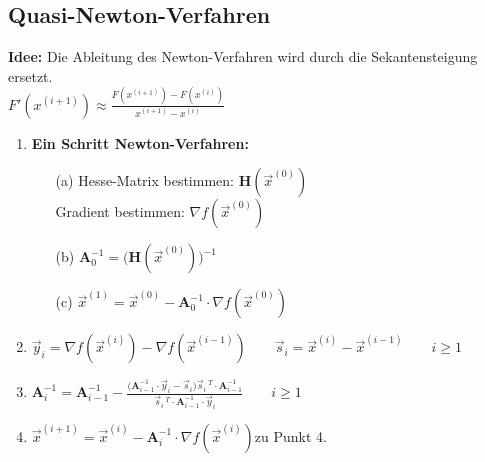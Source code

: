 \subsection{Quasi-Newton-Verfahren}
  \begin{minipage}{13cm}
  \textbf{Idee:} Die Ableitung des Newton-Verfahren wird durch die Sekantensteigung ersetzt.\\
  
  $F'(x^{(i+1)})\approx\frac{F(x^{(i+1)})-F(x^{(i)})}{x^{(i+1)}-x^{(i)}}$\\
  
 \begin{enumerate}
 \item \textbf{Ein Schritt Newton-Verfahren:}
	 \begin{enumerate}
	 \item[(a)] Hesse-Matrix bestimmen: $\mathbf{H}(\vec{x}^{(0)})$\\
	 Gradient bestimmen: $\nabla f(\vec{x}^{(0)})$
	 \item[(b)] $\mathbf{A}_{0}^{-1}=\bigl(\mathbf{H}(\vec{x}^{(0)})\bigr)^{-1}$
	 \item[(c)] $\vec{x}^{(1)}=\vec{x}^{(0)}-\mathbf{A}_{0}^{-1}\cdot\nabla f(\vec{x}^{(0)})$\\
	 \end{enumerate}
 \item $\vec{y}_i=\nabla f(\vec{x}^{(i)})-\nabla f(\vec{x}^{(i-1)})\qquad \vec{s}_i=\vec{x}^{(i)}-\vec{x}^{(i-1)} \qquad i\geq 1$
 \item $\mathbf{A}_{i}^{-1}=\mathbf{A}_{i-1}^{-1}-\displaystyle\frac{\bigl(\mathbf{A}_{i-1}^{-1}\cdot \vec{y}_i-\vec{s}_i\bigr)\vec{s}_i\,^T\cdot \mathbf{A}_{i-1}^{-1}}{\vec{s}_i\,^T\cdot \mathbf{A}_{i-1}^{-1}\cdot\vec{y}_i}\qquad i\geq 1$\\
 \item $\vec{x}^{(i+1)}=\vec{x}^{(i)}-\mathbf{A}_{i}^{-1}\cdot\nabla f(\vec{x}^{(i)})$\qquad zu Punkt 4.
 \end{enumerate}
 
\end{minipage}
